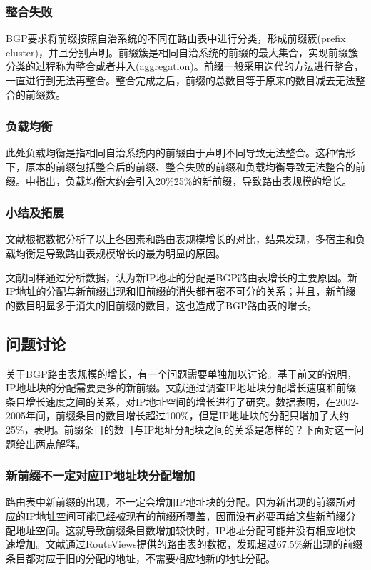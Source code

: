 \documentclass[11pt,twocolumn]{article}
\begin{document}
\subsubsection{整合失败}
BGP要求将前缀按照自治系统的不同在路由表中进行分类，形成前缀簇(prefix cluster)，并且分别声明。前缀簇是相同自治系统的前缀的最大集合\cite{Analysis}，实现前缀簇分类的过程称为整合或者并入(aggregation)。前缀一般采用迭代的方法进行整合，一直进行到无法再整合。整合完成之后，前缀的总数目等于原来的数目减去无法整合的前缀数。

\subsubsection{负载均衡}
此处负载均衡是指相同自治系统内的前缀由于声明不同导致无法整合。这种情形下，原本的前缀包括整合后的前缀、整合失败的前缀和负载均衡导致无法整合的前缀。\cite{RTG}中指出，负载均衡大约会引入20\%\~25\%的新前缀，导致路由表规模的增长。

\subsubsection{小结及拓展}
文献\cite{IPv4}根据数据分析了以上各因素和路由表规模增长的对比，结果发现，多宿主和负载均衡是导致路由表规模增长的最为明显的原因。

文献\cite{Impact}同样通过分析数据，认为新IP地址的分配是BGP路由表增长的主要原因。新IP地址的分配与新前缀出现和旧前缀的消失都有密不可分的关系；并且，新前缀的数目明显多于消失的旧前缀的数目，这也造成了BGP路由表的增长。

\subsection{问题讨论}
关于BGP路由表规模的增长，有一个问题需要单独加以讨论。基于前文的说明，IP地址块的分配需要更多的新前缀。文献\cite{RTG}通过调查IP地址块分配增长速度和前缀条目增长速度之间的关系，对IP地址空间的增长进行了研究。数据表明，在2002-2005年间，前缀条目的数目增长超过100\%，但是IP地址块的分配只增加了大约25\%，表明。前缀条目的数目与IP地址分配块之间的关系是怎样的？下面对这一问题给出两点解释。

\subsubsection{新前缀不一定对应IP地址块分配增加}
路由表中新前缀的出现，不一定会增加IP地址块的分配。因为新出现的前缀所对应的IP地址空间可能已经被现有的前缀所覆盖，因而没有必要再给这些新前缀分配地址空间。这就导致前缀条目数增加较快时，IP地址分配可能并没有相应地快速增加。文献\cite{Impact}通过RouteViews提供的路由表的数据，发现超过67.5\%新出现的前缀条目都对应于旧的分配的地址，不需要相应地新的地址分配。
\end{document}

